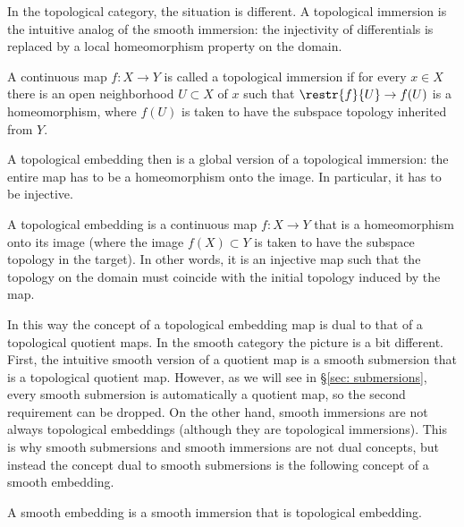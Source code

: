 In the topological category, the situation is different. A topological immersion is the intuitive analog of the smooth immersion: the injectivity of differentials is replaced by a local homeomorphism property on the domain. 

\begin{defn}
    A continuous map $f:X\to Y$ is called a topological immersion if for every $x\in X$ there is an open neighborhood $U\subset X$ of $x$ such that $\restr{f}{U}\to f(U)$ is a homeomorphism, where $f(U)$ is taken to have the subspace topology inherited from $Y$.
\end{defn}

A topological embedding then is a global version of a topological immersion: the entire map has to be a homeomorphism onto the image. In particular, it has to be injective.

\begin{defn}
A topological embedding is a continuous map $f:X\to Y$ that is a homeomorphism onto its image (where the image $f(X)\subset Y$ is taken to have the subspace topology in the target). In other words, it is an injective map such that the topology on the domain must coincide with the initial topology induced by the map.
\end{defn}


In this way the concept of a topological embedding map is dual to that of a topological quotient maps. In the smooth category the picture is a bit different. First, the intuitive smooth version of a quotient map is a smooth submersion that is a topological quotient map. However, as we will see in \S\ref{sec: submersions}, every smooth submersion is automatically a quotient map, so the second requirement can be dropped. On the other hand, smooth immersions are not always topological embeddings (although they are topological immersions). This is why smooth submersions and smooth immersions are not dual concepts, but instead the concept dual to smooth submersions is the following concept of a smooth embedding.

\begin{defn}
A smooth embedding is a smooth immersion that is topological embedding.
\end{defn}


